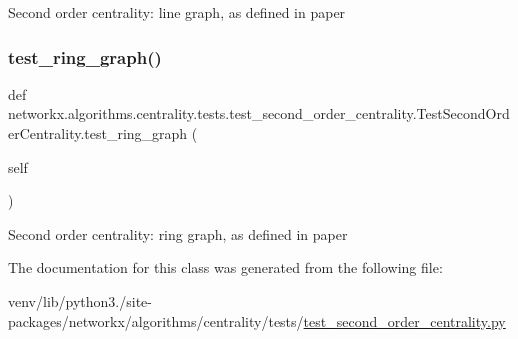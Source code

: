 \begin{DoxyVerb}Second order centrality: line graph, as defined in paper\end{DoxyVerb}
 \mbox{\label{classnetworkx_1_1algorithms_1_1centrality_1_1tests_1_1test__second__order__centrality_1_1TestSecondOrderCentrality_aa2c32ee9cb5e21764ae19fa49c3d98e1}} 
\subsubsection{\texorpdfstring{test\+\_\+ring\+\_\+graph()}{test\_ring\_graph()}}
{\footnotesize\ttfamily def networkx.\+algorithms.\+centrality.\+tests.\+test\+\_\+second\+\_\+order\+\_\+centrality.\+Test\+Second\+Order\+Centrality.\+test\+\_\+ring\+\_\+graph (\begin{DoxyParamCaption}\item[{}]{self }\end{DoxyParamCaption})}

\begin{DoxyVerb}Second order centrality: ring graph, as defined in paper\end{DoxyVerb}
 

The documentation for this class was generated from the following file\+:\begin{DoxyCompactItemize}
\item 
venv/lib/python3./site-\/packages/networkx/algorithms/centrality/tests/\hyperlink{test__second__order__centrality_8py}{test\+\_\+second\+\_\+order\+\_\+centrality.\+py}\end{DoxyCompactItemize}
